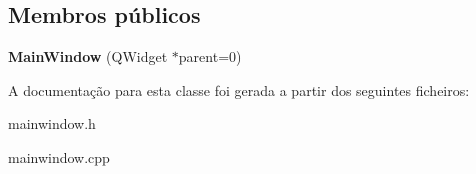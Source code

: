 \subsection*{Membros públicos}
\begin{DoxyCompactItemize}
\item 
\hypertarget{class_main_window_a8b244be8b7b7db1b08de2a2acb9409db}{{\bfseries Main\-Window} (Q\-Widget $\ast$parent=0)}\label{class_main_window_a8b244be8b7b7db1b08de2a2acb9409db}

\end{DoxyCompactItemize}


A documentação para esta classe foi gerada a partir dos seguintes ficheiros\-:\begin{DoxyCompactItemize}
\item 
mainwindow.\-h\item 
mainwindow.\-cpp\end{DoxyCompactItemize}
